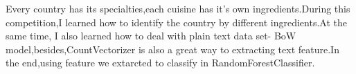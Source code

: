 \documentclass{tikzposter} %
\begin{document}
\begin{columns}
{
\begin{description}
  \item 
  Every country has its specialties,each cuisine has it's own ingredients.During this competition,I learned how to
identify the country by different ingredients.At the same time, I also learned how to deal with plain text data set-
BoW model,besides,CountVectorizer is also a great way to extracting text feature.In the end,using feature we extarcted to
classify in RandomForestClassifier.
\end{description}
}





\end{columns}



\end{document}
